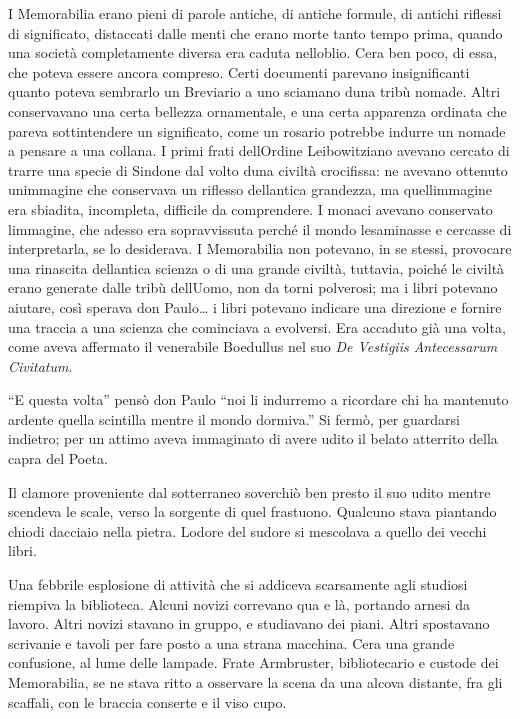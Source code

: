 I Memorabilia erano pieni di parole antiche, di antiche formule, di
antichi riflessi di significato, distaccati dalle menti che erano morte
tanto tempo prima, quando una società completamente diversa era caduta
nell\textquotesingle oblio. C\textquotesingle era ben poco, di essa, che
poteva essere ancora compreso. Certi documenti parevano insignificanti
quanto poteva sembrarlo un Breviario a uno sciamano
d\textquotesingle una tribù nomade. Altri conservavano una certa
bellezza ornamentale, e una certa apparenza ordinata che pareva
sottintendere un significato, come un rosario potrebbe indurre un nomade
a pensare a una collana. I primi frati dell\textquotesingle Ordine
Leibowitziano avevano cercato di trarre una specie di Sindone dal volto
d\textquotesingle una civiltà crocifissa: ne avevano ottenuto
un\textquotesingle immagine che conservava un riflesso
dell\textquotesingle antica grandezza, ma quell\textquotesingle immagine
era sbiadita, incompleta, difficile da comprendere. I monaci avevano
conservato l\textquotesingle immagine, che adesso era sopravvissuta
perché il mondo l\textquotesingle esaminasse e cercasse di
interpretarla, se lo desiderava. I Memorabilia non potevano, in se
stessi, provocare una rinascita dell\textquotesingle antica scienza o di
una grande civiltà, tuttavia, poiché le civiltà erano generate dalle
tribù dell\textquotesingle Uomo, non da torni polverosi; ma i libri
potevano aiutare, così sperava don Paulo\ldots{} i libri potevano
indicare una direzione e fornire una traccia a una scienza che
cominciava a evolversi. Era accaduto già una volta, come aveva affermato
il venerabile Boedullus nel suo \emph{De Vestigiis Antecessarum
	Civitatum}.

``E questa volta'' pensò don Paulo ``noi li indurremo a ricordare chi ha
mantenuto ardente quella scintilla mentre il mondo dormiva.'' Si fermò,
per guardarsi indietro; per un attimo aveva immaginato di avere udito il
belato atterrito della capra del Poeta.

Il clamore proveniente dal sotterraneo soverchiò ben presto il suo udito
mentre scendeva le scale, verso la sorgente di quel frastuono. Qualcuno
stava piantando chiodi d\textquotesingle acciaio nella pietra.
L\textquotesingle odore del sudore si mescolava a quello dei vecchi
libri.

Una febbrile esplosione di attività che si addiceva scarsamente agli
studiosi riempiva la biblioteca. Alcuni novizi correvano qua e là,
portando arnesi da lavoro. Altri novizi stavano in gruppo, e studiavano
dei piani. Altri spostavano scrivanie e tavoli per fare posto a una
strana macchina. C\textquotesingle era una grande confusione, al lume
delle lampade. Frate Armbruster, bibliotecario e custode dei
Memorabilia, se ne stava ritto a osservare la scena da una alcova
distante, fra gli scaffali, con le braccia conserte e il viso cupo.

